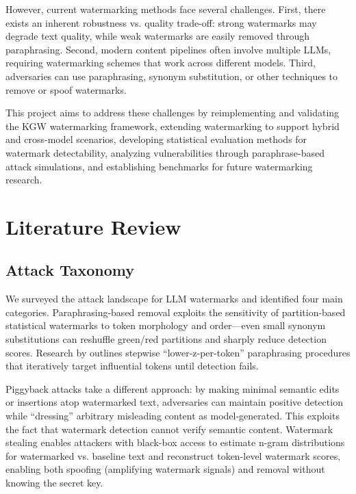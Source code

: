 \documentclass[12pt,letterpaper]{article}
\begin{document}
However, current watermarking methods face several challenges. First, there exists an inherent robustness vs. quality trade-off: strong watermarks may degrade text quality, while weak watermarks are easily removed through paraphrasing. Second, modern content pipelines often involve multiple LLMs, requiring watermarking schemes that work across different models. Third, adversaries can use paraphrasing, synonym substitution, or other techniques to remove or spoof watermarks.

This project aims to address these challenges by reimplementing and validating the KGW watermarking framework, extending watermarking to support hybrid and cross-model scenarios, developing statistical evaluation methods for watermark detectability, analyzing vulnerabilities through paraphrase-based attack simulations, and establishing benchmarks for future watermarking research.

\section{Literature Review}

\subsection{Attack Taxonomy}

We surveyed the attack landscape for LLM watermarks and identified four main categories. Paraphrasing-based removal exploits the sensitivity of partition-based statistical watermarks to token morphology and order---even small synonym substitutions can reshuffle green/red partitions and sharply reduce detection scores. Research by \cite{nofree2024} outlines stepwise ``lower-z-per-token'' paraphrasing procedures that iteratively target influential tokens until detection fails.

Piggyback attacks take a different approach: by making minimal semantic edits or insertions atop watermarked text, adversaries can maintain positive detection while ``dressing'' arbitrary misleading content as model-generated. This exploits the fact that watermark detection cannot verify semantic content. Watermark stealing \cite{watermarkstealing2024} enables attackers with black-box access to estimate n-gram distributions for watermarked vs. baseline text and reconstruct token-level watermark scores, enabling both spoofing (amplifying watermark signals) and removal without knowing the secret key.
\end{document}
